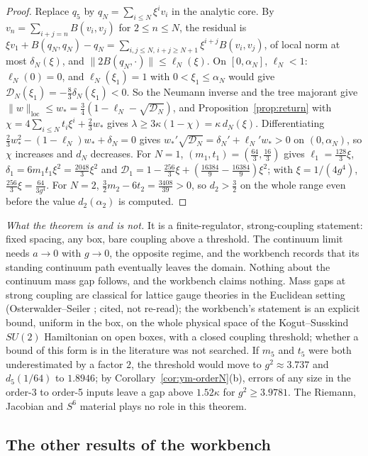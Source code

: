 \begin{proof}
Replace $q_5$ by $q_N=\sum_{i\le N}\xi^iv_i$ in the analytic core. By $v_n=\sum_{i+j=n}B(v_i,v_j)$ for $2\le n\le N$, the residual is $\xi v_1+B(q_N,q_N)-q_N=\sum_{i,j\le N,\,i+j\ge N+1}\xi^{i+j}B(v_i,v_j)$, of local norm at most $\delta_N(\xi)$, and $\|2B(q_N,\cdot)\|\le\ell_N(\xi)$. On $[0,\alpha_N]$, $\ell_N<1$: $\ell_N(0)=0$, and $\ell_N(\xi_1)=1$ with $0<\xi_1\le\alpha_N$ would give $\mathcal D_N(\xi_1)=-\frac83\delta_N(\xi_1)<0$. So the Neumann inverse and the tree majorant give $\|w\|_{\mathrm{loc}}\le w_*=\frac34(1-\ell_N-\sqrt{\mathcal D_N})$, and Proposition~\ref{prop:return} with $\chi=4\sum_{i\le N}t_i\xi^i+\frac23w_*$ gives $\lambda\ge3\kappa(1-\chi)=\kappa\,d_N(\xi)$. Differentiating $\frac23w_*^2-(1-\ell_N)w_*+\delta_N=0$ gives $w_*'\sqrt{\mathcal D_N}=\delta_N'+\ell_N'w_*>0$ on $(0,\alpha_N)$, so $\chi$ increases and $d_N$ decreases. For $N=1$, $(m_1,t_1)=(\frac{64}3,\frac{16}3)$ gives $\ell_1=\frac{128}3\xi$, $\delta_1=6m_1t_1\xi^2=\frac{2048}3\xi^2$ and $\mathcal D_1=1-\frac{256}3\xi+(\frac{16384}9-\frac{16384}9)\xi^2$; with $\xi=1/(4g^4)$, $\frac{256}3\xi=\frac{64}{3g^4}$. For $N=2$, $\frac32m_2-6t_2=\frac{3408}{39}>0$, so $d_2>\frac32$ on the whole range even before the value $d_2(\alpha_2)$ is computed.
\end{proof}

\emph{What the theorem is and is not.} It is a finite-regulator, strong-coupling statement: fixed spacing, any box, bare coupling above a threshold. The continuum limit needs $a\to0$ with $g\to0$, the opposite regime, and the workbench records that its standing continuum path eventually leaves the domain. Nothing about the continuum mass gap follows, and the workbench claims nothing. Mass gaps at strong coupling are classical for lattice gauge theories in the Euclidean setting (Osterwalder--Seiler \cite{OsterwalderSeiler}; cited, not re-read); the workbench's statement is an explicit bound, uniform in the box, on the whole physical space of the Kogut--Susskind $SU(2)$ Hamiltonian on open boxes, with a closed coupling threshold; whether a bound of this form is in the literature was not searched. If $m_5$ and $t_5$ were both underestimated by a factor $2$, the threshold would move to $g^2\approx3.737$ and $d_5(1/64)$ to $1.8946$; by Corollary~\ref{cor:ym-orderN}(b), errors of any size in the order-3 to order-5 inputs leave a gap above $1.52\kappa$ for $g^2\ge3.9781$. The Riemann, Jacobian and $S^6$ material plays no role in this theorem.

\subsection{The other results of the workbench}

